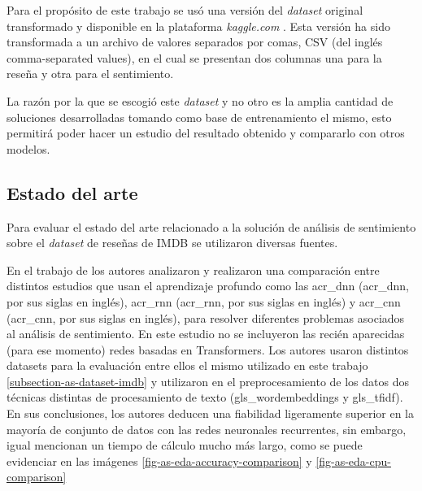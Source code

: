 Para el propósito de este trabajo se usó una versión del \textit{dataset} original transformado y disponible en la plataforma \textit{kaggle.com} \citep{n_2019}. Esta versión ha sido transformada a un archivo de valores separados por comas, CSV (del inglés comma-separated values), en el cual se presentan dos columnas una para la reseña y otra para el sentimiento.

La razón por la que se escogió este \textit{dataset} y no otro es la amplia cantidad de soluciones desarrolladas tomando como base de entrenamiento el mismo, esto permitirá poder hacer un estudio del resultado obtenido y compararlo con otros modelos.


\subsection{Estado del arte}
\label{subsection-as-estado-del-arte}

Para evaluar el estado del arte relacionado a la solución de análisis de sentimiento sobre el \textit{dataset} de reseñas de IMDB se utilizaron diversas fuentes. 

En el trabajo de \cite{Dang_2020} los autores analizaron y realizaron una comparación entre distintos estudios que usan el aprendizaje profundo como las \acrlong{acr_dnn} (\acrshort{acr_dnn}, por sus siglas en inglés), \acrlong{acr_rnn} (\acrshort{acr_rnn}, por sus siglas en inglés) y \acrlong{acr_cnn} (\acrshort{acr_cnn}, por sus siglas en inglés), para resolver diferentes problemas asociados al análisis de sentimiento. En este estudio no se incluyeron las recién aparecidas (para ese momento) redes basadas en Transformers. Los autores usaron distintos datasets para la evaluación entre ellos el mismo utilizado en este trabajo \ref{subsection-as-dataset-imdb} y utilizaron en el preprocesamiento de los datos dos técnicas distintas de procesamiento de texto (\gls{gls_wordembeddings} y \gls{gls_tfidf}). En sus conclusiones, los autores deducen una fiabilidad ligeramente superior en la mayoría de conjunto de datos con las redes neuronales recurrentes, sin embargo, igual mencionan un tiempo de cálculo mucho más largo, como se puede evidenciar en las imágenes \ref{fig-as-eda-accuracy-comparison} y \ref{fig-as-eda-cpu-comparison} 

